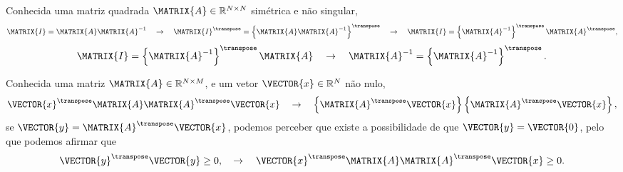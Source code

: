 \begin{myproofT}\label{proof:theo:simetricmatrix4}
Conhecida uma matriz quadrada $\MATRIX{A} \in \mathbb{R}^{N \times N}$ simétrica e não singular, 
\begin{equation}
\MATRIX{I}=\MATRIX{A}\MATRIX{A}^{-1}
\quad \rightarrow \quad
\MATRIX{I}^{\transpose}=\left\{\MATRIX{A}\MATRIX{A}^{-1}\right\}^{\transpose}
\quad \rightarrow \quad
\MATRIX{I}=\left\{\MATRIX{A}^{-1}\right\}^{\transpose} \MATRIX{A}^{\transpose},
\end{equation}
\begin{equation}
\MATRIX{I}=\left\{\MATRIX{A}^{-1}\right\}^{\transpose} \MATRIX{A}
\quad \rightarrow \quad
\MATRIX{A}^{-1}=\left\{\MATRIX{A}^{-1}\right\}^{\transpose}.
\end{equation}
\end{myproofT}


\begin{myproofT}\label{proof:theo:semipositivematrix1}
Conhecida uma matriz $\MATRIX{A} \in \mathbb{R}^{N \times M}$,
e um vetor $\VECTOR{x} \in \mathbb{R}^{N}$ não nulo,
\begin{equation}
\VECTOR{x}^{\transpose}\MATRIX{A}\MATRIX{A}^{\transpose}\VECTOR{x}
\quad \rightarrow \quad
\left\{\MATRIX{A}^{\transpose}\VECTOR{x}\right\}\left\{\MATRIX{A}^{\transpose}\VECTOR{x}\right\},
\end{equation}
se $\VECTOR{y}=\MATRIX{A}^{\transpose}\VECTOR{x}$, 
podemos perceber que existe a possibilidade de que $\VECTOR{y}=\VECTOR{0}$,
pelo que podemos afirmar que 
\begin{equation}
\VECTOR{y}^{\transpose}\VECTOR{y}\geq 0,
\quad \rightarrow \quad
\VECTOR{x}^{\transpose}\MATRIX{A}\MATRIX{A}^{\transpose}\VECTOR{x}\geq 0.
\end{equation}
\end{myproofT}

